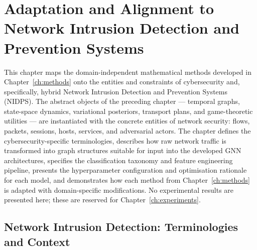 
\chapter{Adaptation and Alignment to Network Intrusion Detection and Prevention Systems}
\label{ch:adaptation}

This chapter maps the domain-independent mathematical methods developed in Chapter~\ref{ch:methods} onto the entities and constraints of cybersecurity and, specifically, hybrid Network Intrusion Detection and Prevention Systems (NIDPS). The abstract objects of the preceding chapter --- temporal graphs, state-space dynamics, variational posteriors, transport plans, and game-theoretic utilities --- are instantiated with the concrete entities of network security: flows, packets, sessions, hosts, services, and adversarial actors. The chapter defines the cybersecurity-specific terminologies, describes how raw network traffic is transformed into graph structures suitable for input into the developed GNN architectures, specifies the classification taxonomy and feature engineering pipeline, presents the hyperparameter configuration and optimisation rationale for each model, and demonstrates how each method from Chapter~\ref{ch:methods} is adapted with domain-specific modifications. No experimental results are presented here; these are reserved for Chapter~\ref{ch:experiments}.


\section{Network Intrusion Detection: Terminologies and Context}
\label{sec:nidps_context}

